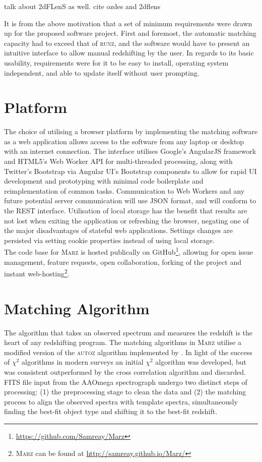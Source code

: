 \documentclass[iop]{emulateapj}
\newcommand{\green}{\color{LimeGreen}}
\newcommand{\runz}{\textsc{runz}}
\newcommand{\autoz}{\textsc{autoz}}
\newcommand{\marz}{\textsc{Marz}}
\begin{document}
{\green talk about 2dFLenS as well. cite ozdes and 2dflens}

It is from the above motivation that a set of minimum requirements were drawn up for the proposed software project. First and foremost, the automatic matching capacity had to exceed that of \runz{}, and the software would have to present an intuitive interface to allow manual redshifting by the user. In regards to its basic usability, requirements were for it to be easy to install, operating system independent, and able to update itself without user prompting. 



\section{Platform}

The choice of utilising a browser platform by implementing the matching software as a web application allows access to the software from any laptop or desktop with an internet connection. The interface utilises Google's AngularJS framework and HTML5's Web Worker API for multi-threaded processing, along with Twitter's Bootstrap via Angular UI's Bootstrap components to allow for rapid UI development and prototyping with minimal code boilerplate and reimplementation of common tasks. Communication to Web Workers and any future potential server communication will use JSON format, and will conform to the REST interface. Utilisation of local storage has the benefit that results are not lost when exiting the application or refreshing the browser, negating one of the major disadvantages of stateful web applications. Settings changes are persisted via setting cookie properties instead of using local storage.\\

The code base for \marz{} is hosted publically on GitHub\footnote{\url{https://github.com/Samreay/Marz}}, allowing for open issue management, feature requests, open collaboration, forking of the project and instant web-hosting\footnote{\marz{} can be found at \url{http://samreay.github.io/Marz/}}.




\section{Matching Algorithm}

The algorithm that takes an observed spectrum and measures the redshift is the heart of any redshifting program. The matching algorithms in \marz{} utilise a modified version of the \autoz{} algorithm implemented by \citet{baldry2014galaxy}. In light of the success of $\chi^2$ algorithms in modern surveys \cite{bolton2012} an initial $\chi^2$ algorithm was developed, but was consistent outperformed by the cross correlation algorithm and discarded. FITS file input from the AAOmega spectrograph undergo two distinct steps of processing: (1) the preprocessing stage to clean the data and (2) the matching process to align the observed spectra with template spectra, simultaneously finding the best-fit object type and shifting it to the best-fit redshift.\\
\end{document}
